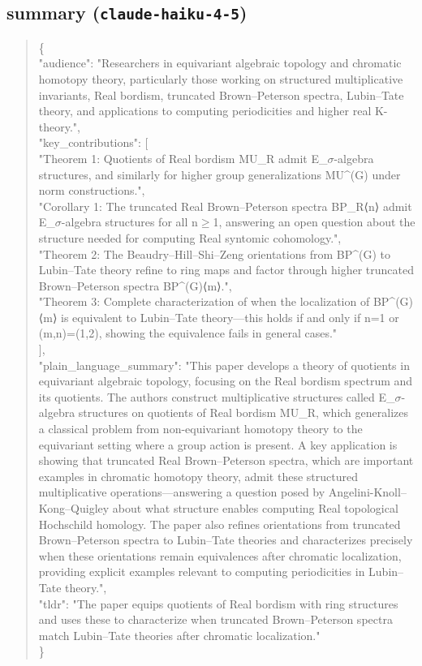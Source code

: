 \documentclass[11pt]{article}
\begin{document}
\subsection*{summary (\texttt{claude-haiku-4-5})}
\begin{quote}\small\ttfamily\raggedright
\{\\
  "audience": "Researchers in equivariant algebraic topology and chromatic homotopy theory, particularly those working on structured multiplicative invariants, Real bordism, truncated Brown--Peterson spectra, Lubin--Tate theory, and applications to computing periodicities and higher real K-theory.",\\
  "key\_contributions": [\\
    "Theorem 1: Quotients of Real bordism MU\_R admit E\_\ensuremath{\sigma}-algebra structures, and similarly for higher group generalizations MU\^{}(G) under norm constructions.",\\
    "Corollary 1: The truncated Real Brown--Peterson spectra BP\_R⟨n⟩ admit E\_\ensuremath{\sigma}-algebra structures for all n\ensuremath{\ge}1, answering an open question about the structure needed for computing Real syntomic cohomology.",\\
    "Theorem 2: The Beaudry--Hill--Shi--Zeng orientations from BP\^{}(G) to Lubin--Tate theory refine to ring maps and factor through higher truncated Brown--Peterson spectra BP\^{}(G)⟨m⟩.",\\
    "Theorem 3: Complete characterization of when the localization of BP\^{}(G)⟨m⟩ is equivalent to Lubin--Tate theory---this holds if and only if n=1 or (m,n)=(1,2), showing the equivalence fails in general cases."\\
  ],\\
  "plain\_language\_summary": "This paper develops a theory of quotients in equivariant algebraic topology, focusing on the Real bordism spectrum and its quotients. The authors construct multiplicative structures called E\_\ensuremath{\sigma}-algebra structures on quotients of Real bordism MU\_R, which generalizes a classical problem from non-equivariant homotopy theory to the equivariant setting where a group action is present. A key application is showing that truncated Real Brown--Peterson spectra, which are important examples in chromatic homotopy theory, admit these structured multiplicative operations---answering a question posed by Angelini-Knoll--Kong--Quigley about what structure enables computing Real topological Hochschild homology. The paper also refines orientations from truncated Brown--Peterson spectra to Lubin--Tate theories and characterizes precisely when these orientations remain equivalences after chromatic localization, providing explicit examples relevant to computing periodicities in Lubin--Tate theory.",\\
  "tldr": "The paper equips quotients of Real bordism with ring structures and uses these to characterize when truncated Brown--Peterson spectra match Lubin--Tate theories after chromatic localization."\\
\}\\
\end{quote}
\end{document}
